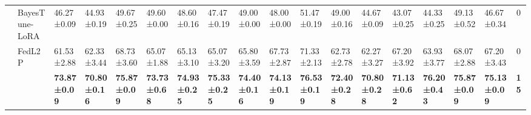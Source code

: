 \begin{table*}[t]
\begin{scriptsize}
{\begin{tabular}{c|l|l|l|l|l|l|l|l|l|l|l|l|l|l|l|l|c}
                    & BayesTune-LoRA                            & 46.27±0.09                       & 44.93±0.19                       & 49.67±0.25                       & 49.60±0.00                        & 48.60±0.16                        & 47.47±0.19                       & 49.00±0.00                        & 48.00±0.00                        & 51.47±0.19                       & 49.00±0.16                        & 44.67±0.09                       & 43.07±0.25                       & 44.33±0.25                       & 49.13±0.52                       & 46.67±0.34                       & 0             \\ %
                    & FedL2P                               & 61.53±2.88                       & 62.33±3.44                       & 68.73±3.60                       & 65.07±1.88                       & 65.13±3.10                        & 65.07±3.20                        & 65.80±3.59                        & 67.73±2.87                       & 71.33±2.13                       & 62.73±2.78                       & 62.27±3.27                       & 67.20±3.92                        & 63.93±3.77                       & 68.07±2.88                       & 67.20±3.43                        & 0             \\ %
                    & \method{}                                 & \textbf{73.87±0.09}              & \textbf{70.80±0.16}               & \textbf{75.87±0.09}              & \textbf{73.73±0.68}              & \textbf{74.93±0.25}              & \textbf{75.33±0.25}              & \textbf{74.40±0.16}               & \textbf{74.13±0.19}              & \textbf{76.53±0.19}              & \textbf{72.40±0.28}               & \textbf{70.80±0.28}               & \textbf{71.13±0.62}              & \textbf{76.20±0.43}               & \textbf{75.87±0.09}              & \textbf{75.13±0.09}              & \textbf{15}   \\ \bottomrule
\end{tabular}
}
\end{scriptsize}
\vspace{-1.5em}
\end{table*}
